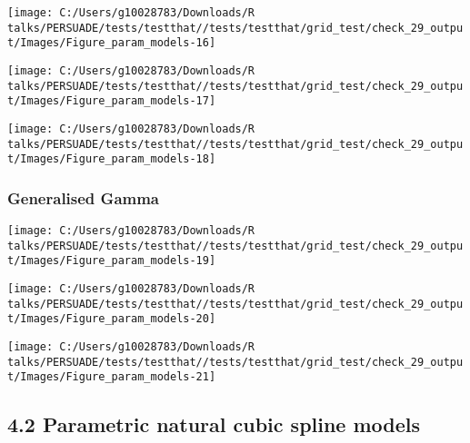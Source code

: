 \documentclass[
]{article}
\begin{document}
\begin{flushleft}\texttt{[image: C:/Users/g10028783/Downloads/R talks/PERSUADE/tests/testthat//tests/testthat/grid\_test/check\_29\_output/Images/Figure\_param\_models-16]} \end{flushleft}

\begin{flushleft}\texttt{[image: C:/Users/g10028783/Downloads/R talks/PERSUADE/tests/testthat//tests/testthat/grid\_test/check\_29\_output/Images/Figure\_param\_models-17]} \end{flushleft}

\begin{flushleft}\texttt{[image: C:/Users/g10028783/Downloads/R talks/PERSUADE/tests/testthat//tests/testthat/grid\_test/check\_29\_output/Images/Figure\_param\_models-18]} \end{flushleft}

\clearpage

\subsubsection{Generalised Gamma}\label{generalised-gamma}

\begin{flushleft}\texttt{[image: C:/Users/g10028783/Downloads/R talks/PERSUADE/tests/testthat//tests/testthat/grid\_test/check\_29\_output/Images/Figure\_param\_models-19]} \end{flushleft}

\begin{flushleft}\texttt{[image: C:/Users/g10028783/Downloads/R talks/PERSUADE/tests/testthat//tests/testthat/grid\_test/check\_29\_output/Images/Figure\_param\_models-20]} \end{flushleft}

\begin{flushleft}\texttt{[image: C:/Users/g10028783/Downloads/R talks/PERSUADE/tests/testthat//tests/testthat/grid\_test/check\_29\_output/Images/Figure\_param\_models-21]} \end{flushleft}

\clearpage

\subsection{4.2 Parametric natural cubic spline
models}\label{parametric-natural-cubic-spline-models}
\end{document}
